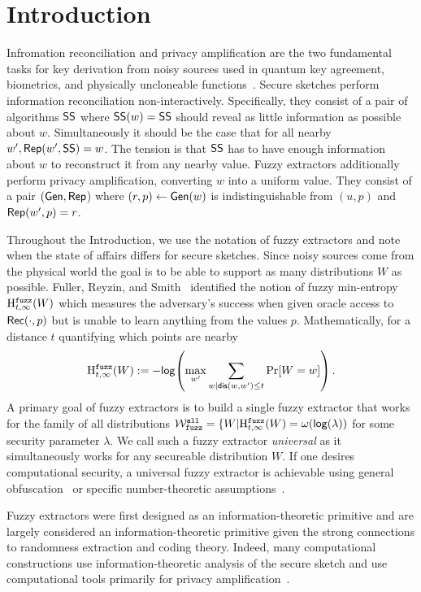 
\section{Introduction}
Infromation reconciliation and privacy amplification are the two fundamental tasks for key derivation from noisy sources used in quantum key agreement, biometrics, and physically uncloneable functions~\cite{bennett1988privacy,dodis2008fuzzy}. Secure sketches perform information reconciliation non-interactively.  Specifically, they consist of a pair of algorithms ${\mathsf{SS}}$ where ${\mathsf{SS}}(w) = {\mathsf{SS}}$ should reveal as little information as possible about $w$.  Simultaneously it should be the case that for all nearby $w', {\mathsf{Rep}}(w', {\mathsf{SS}}) = w$.  The tension is that ${\mathsf{SS}}$ has to have enough information about $w$ to reconstruct it from any nearby value.  Fuzzy extractors additionally perform privacy amplification, converting $w$ into a uniform value.  They consist of a pair $({\mathsf{Gen}}, {\mathsf{Rep}}$) where $(r, p)\leftarrow {\ensuremath{\mathsf{Gen}}}(w)$ is indistinguishable from $(u, p)$ and ${\mathsf{Rep}}(w', p) =r$.

Throughout the Introduction, we use the notation of fuzzy extractors and note when the state of affairs differs for secure sketches.
Since noisy sources come from the physical world the goal is to be able to support as many distributions $W$ as possible.  Fuller, Reyzin, and Smith~\cite{fuller2016fuzzy,fuller2020fuzzy} identified the notion of fuzzy min-entropy $\mathrm{H}^{\mathtt{fuzz}}_{t,\infty}(W)$ which measures the adversary's success when given oracle access to ${\mathsf{Rec}}(\cdot, p)$ but is unable to learn anything from the values  $p$.  Mathematically, for a distance $t$ quantifying which points are nearby
\[
\mathrm{H}^{\mathtt{fuzz}}_{t,\infty}(W):= -\mathsf{log}\!\left(\max_{w'} \sum_{w | \mathsf{dis}(w, w')\le t} \Pr[W=w]\right).
\]A primary goal of fuzzy extractors is to build a single fuzzy extractor that works for the family of all distributions $\mathcal{W}_{\mathtt{fuzz}}^{\mathtt{all}} = \{ W | \mathrm{H}^{\mathtt{fuzz}}_{t,\infty}(W) = \omega(\mathsf{log}\!\left(\lambda\right))$ for some security parameter $\lambda$.  We call such a fuzzy extractor \emph{universal} as it simultaneously works for any secureable distribution $W$. 
If one desires computational security, a universal fuzzy extractor is achievable using general obfuscation~\cite{BarakBCKPS13,BitanskyCKP14,bitansky2017virtual} or specific number-theoretic assumptions~\cite{galbraith2019obfuscated}. 

Fuzzy extractors were first designed as an information-theoretic primitive and are largely considered an information-theoretic primitive given the strong connections to randomness extraction and coding theory.  Indeed, many computational constructions use information-theoretic analysis of the secure sketch and use computational tools primarily for privacy amplification~\cite{wen2018robustly,wen2019generic}.  

